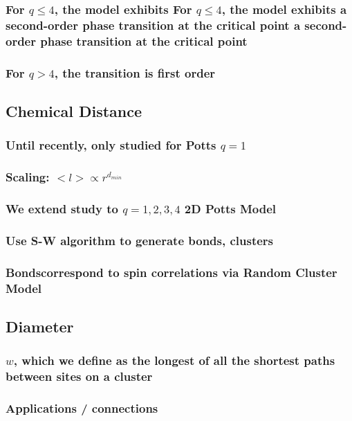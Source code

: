 \documentclass{umthesis}
\begin{document}
\subsubsection{For $q \le 4$, the model exhibits For $q \le 4$, the model exhibits a second-order phase transition at the critical point a second-order phase transition at the critical point}
\label{sec-3.1.1.6}
\subsubsection{For $q>4$, the transition is first order \cite{Bax}}
\label{sec-3.1.1.7}
\subsection{Chemical Distance}
\label{sec-3.1.2}
\subsubsection{Until recently, only studied for Potts $q=1$}
\label{sec-3.1.2.1}
\subsubsection{Scaling: $< l > \propto r^{d_{min}}$}
\label{sec-3.1.2.2}
\subsubsection{We extend study to $q=1,2,3,4$ 2D Potts Model}
\label{sec-3.1.2.3}
\subsubsection{Use S-W algorithm to generate bonds, clusters}
\label{sec-3.1.2.4}
\subsubsection{Bondscorrespond to spin correlations via Random Cluster Model}
\label{sec-3.1.2.5}
\subsection{Diameter}
\label{sec-3.1.3}
\subsubsection{$w$, which we define as the longest of all the shortest paths between sites on a cluster}
\label{sec-3.1.3.1}
\subsubsection{Applications / connections}
\label{sec-3.1.3.2}
\end{document}
